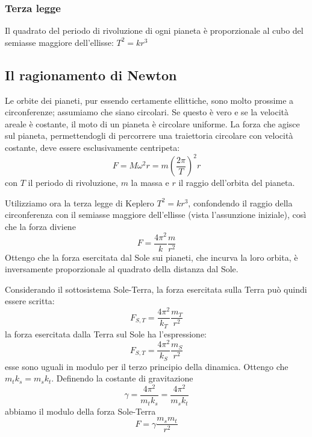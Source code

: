 \documentclass[class=book, crop=false, oneside, 12pt]{standalone}
\begin{document}
\subsubsection{Terza legge}

Il quadrato del periodo di rivoluzione di ogni pianeta è proporzionale al cubo del semiasse maggiore dell'ellisse: $T^2 = k r^3$

\subsection{Il ragionamento di Newton}

Le orbite dei pianeti, pur essendo certamente ellittiche, sono molto prossime a circonferenze; assumiamo che siano circolari.\newline
Se questo è vero e se la velocità areale è costante, il moto di un pianeta è circolare uniforme.
La forza che agisce sul pianeta, permettendogli di percorrere una traiettoria circolare  con velocità costante, deve essere esclusivamente centripeta:
\begin{equation}
    F = M \omega^2 r = m \left(\frac{2 \pi}{T}\right)^2 r
\end{equation}
con \(T\) il periodo di rivoluzione, \(m\) la massa e \(r\) il raggio dell'orbita del pianeta. 

Utilizziamo ora la terza legge di Keplero $T^2 = k r^3$, confondendo il raggio della circonferenza con il semiasse maggiore dell'ellisse (vista l'assunzione iniziale), così che la forza diviene
\begin{equation*}
    F = \frac{4 \pi^2}{k} \frac{m}{r^2}
\end{equation*}
Ottengo che la forza esercitata dal Sole sui pianeti, che incurva la loro orbita, è inversamente proporzionale al quadrato della distanza dal Sole.

Considerando il sottosistema Sole-Terra, la forza esercitata sulla Terra può quindi essere scritta:
\begin{equation*}
    F_{S,T} = \frac{4 \pi^2}{k_T} \frac{m_T}{r^2}
\end{equation*}
la forza esercitata dalla Terra sul Sole ha l'espressione:
\begin{equation*}
    F_{S,T} = \frac{4 \pi^2}{k_S} \frac{m_S}{r^2}
\end{equation*}
esse sono uguali in modulo per il terzo principio della dinamica.
Ottengo che \(m_t k_s = m_s k_t\).
Definendo la costante di gravitazione
\begin{equation}
    \gamma = \frac{4 \pi^2}{m_t k_s} = \frac{4 \pi^2}{m_s k_t}
\end{equation}
abbiamo il modulo della forza Sole-Terra
\begin{equation}
    F = \gamma \frac{m_s m_t}{r^2}
\end{equation}
\end{document}
